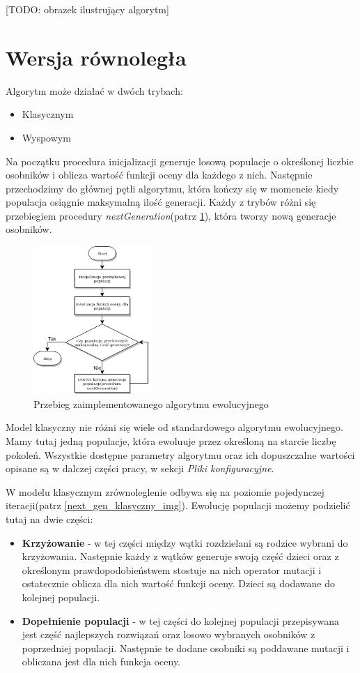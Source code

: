 [TODO: obrazek ilustrujący algorytm]

\section{Wersja równoległa}
Algorytm może działać w dwóch trybach:
\begin{itemize}
    \item Klasycznym
    \item Wyspowym
\end{itemize}

Na początku procedura inicjalizacji generuje losową populacje o określonej liczbie osobników i oblicza wartość funkcji oceny dla każdego z nich. 
Następnie przechodzimy do głównej pętli algorytmu, która kończy się w momencie kiedy populacja osiągnie maksymalną ilość generacji. 
Każdy z trybów różni się przebiegiem procedury \textit{nextGeneration}(patrz \ref{alg_main_img}), która tworzy nową generacje osobników.

\begin{figure}[H]
    \centering        
    \includegraphics[width=0.4\textwidth]{img/alg_main.png}
    \caption{Przebieg zaimplementowanego algorytmu ewolucyjnego}
    \label{alg_main_img}
\end{figure}

Model klasyczny nie różni się wiele od standardowego algorytmu ewolucyjnego. Mamy tutaj jedną populacje, która ewoluuje przez 
określoną na starcie liczbę pokoleń. Wszystkie dostępne parametry algorytmu oraz ich dopuszczalne wartości opisane są w dalczej części pracy, 
w sekcji \textit{Pliki konfiguracyjne}.

W modelu klasycznym zrównoleglenie odbywa się na poziomie pojedynczej iteracji(patrz \ref{next_gen_klasyczny_img}). 
Ewolucję populacji możemy podzielić tutaj na dwie części:
\begin{itemize}
    \item \textbf{Krzyżowanie} - w tej części między wątki rozdzielani są rodzice wybrani do krzyżowania. Następnie każdy z wątków generuje swoją część 
    dzieci oraz z określonym prawdopodobieństwem stostuje na nich operator mutacji i ostatecznie oblicza dla nich wartość funkcji oceny. 
    Dzieci są dodawane do kolejnej populacji.
    \item \textbf{Dopełnienie populacji} - w tej części do kolejnej populacji przepisywana jest część najlepszych rozwiązań oraz losowo wybranych osobników 
    z poprzedniej populacji. Następnie te dodane osobniki są poddawane mutacji i obliczana jest dla nich funkcja oceny.
\end{itemize}

